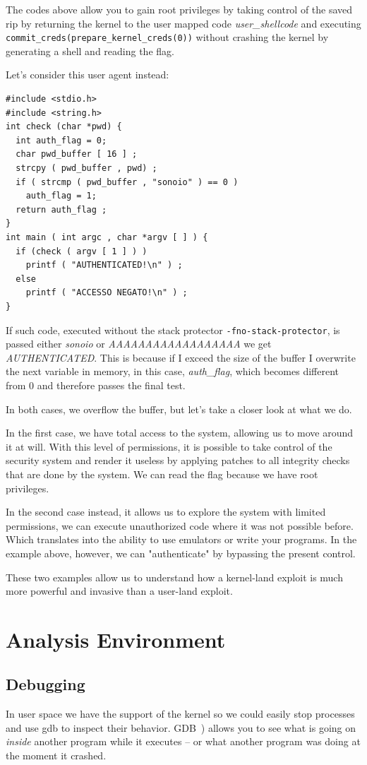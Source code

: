 \documentclass{masterthesis}
\begin{document}
The codes above allow you to gain root privileges by taking control of the saved rip by returning the kernel to the user mapped code \textit{user_shellcode} and executing \texttt{commit_creds(prepare_kernel_creds(0))} without crashing the kernel by generating a shell and reading the flag.

Let's consider this user agent instead:
\begin{lstlisting}
#include <stdio.h>
#include <string.h>
int check (char *pwd) {
  int auth_flag = 0;
  char pwd_buffer [ 16 ] ;
  strcpy ( pwd_buffer , pwd) ;
  if ( strcmp ( pwd_buffer , "sonoio" ) == 0 )
    auth_flag = 1;
  return auth_flag ;
}
int main ( int argc , char *argv [ ] ) {
  if (check ( argv [ 1 ] ) )
    printf ( "AUTHENTICATED!\n" ) ;
  else
    printf ( "ACCESSO NEGATO!\n" ) ;
}
\end{lstlisting}
If such code, executed without the stack protector \texttt{-fno-stack-protector}, is passed either \textit{sonoio} or \textit{AAAAAAAAAAAAAAAAAA} we get \textit{AUTHENTICATED}.
This is because if I exceed the size of the buffer I overwrite the next variable in memory, in this case, \textit{auth_flag}, which becomes different from 0 and therefore passes the final test.

In both cases, we overflow the buffer, but let's take a closer look at what we do.

In the first case, we have total access to the system, allowing us to move around it at will.
With this level of permissions, it is possible to take control of the security system and render it useless by applying patches to all integrity checks that are done by the system.
We can read the flag because we have root privileges.

In the second case instead, it allows us to explore the system with limited permissions, we can execute unauthorized code where it was not possible before. Which translates into the ability to use emulators or write your programs. In the example above, however, we can "authenticate" by bypassing the present control.


These two examples allow us to understand how a kernel-land exploit is much more powerful and invasive than a user-land exploit.


\chapter{Analysis Environment}
\label{ch:analyze}

\section{Debugging}
\label{sect:debugging}
In user space we have the support of the kernel so we could easily stop processes and use gdb to inspect their behavior.
GDB~\cite{stallman1988debugging}) allows you to see what is going on \emph{inside} another program while it executes -- or what another program was doing at the moment it crashed.
\end{document}
